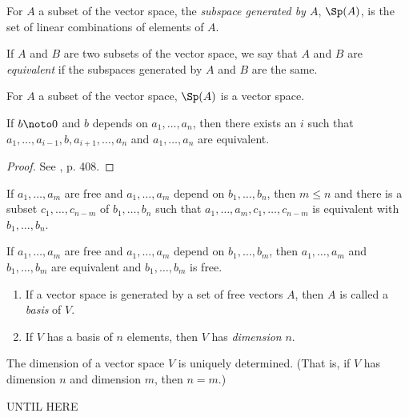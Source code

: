 {\begin{definition}\label{defsubspace} For $A$ a subset of the vector
space, the {\em subspace generated by $A$}, $\Sp(A)$, is the set of
linear combinations of elements of $A$.

If $A$ and $B$ are two subsets of the vector
space, we say that $A$ and $B$ are {\em equivalent\/} if the subspaces
generated by $A$ and $B$ are the same.
\end{definition}

\begin{lemma} For $A$ a subset of the vector
space, $\Sp(A)$ is a vector space.
\end{lemma}

\begin{lemma}
If $b\noto 0$ and $b$ depends on $a_1, \ldots, a_n$, then there exists
an $i$ such that\\ 
$a_1, \ldots, a_{i-1}, b, a_{i+1}, \ldots, a_n$ and
$a_1, \ldots, a_n$ are equivalent.
\end{lemma}

\begin{proof}
See \cite{TvD882}, p. 408.
\end{proof}

\begin{theorem}[Austauschsatz]
If $a_1, \ldots, a_m$ are free and $a_1, \ldots, a_m$ depend on $b_1,
\ldots, b_n$, then $m\leq n$ and there is a subset $c_1, \ldots,
c_{n-m}$ of $b_1, \ldots, b_n$ such that $a_1, \ldots, a_m, c_1, \ldots,
c_{n-m}$ is equivalent with  $b_1, \ldots, b_n$.
\end{theorem}

\begin{corollary}
If $a_1, \ldots, a_m$ are free and $a_1, \ldots, a_m$ depend on $b_1,
\ldots, b_m$, then $a_1, \ldots, a_m$ and $b_1, \ldots, b_m$ are
equivalent and $b_1, \ldots, b_m$ is free.
\end{corollary}

\begin{definition}
\begin{enumerate}
\item If a vector space is generated by a set of free vectors $A$,
then $A$ is called a {\em basis\/} of $V$.
\item If $V$ has a basis of $n$ elements, then $V$ has {\em
dimension\/} $n$.
\end{enumerate}
\end{definition}

\begin{lemma}
The dimension of a vector space $V$ is uniquely determined. (That is,
if $V$ has dimension $n$ and dimension $m$, then $n=m$.)
\end{lemma}

UNTIL HERE }

